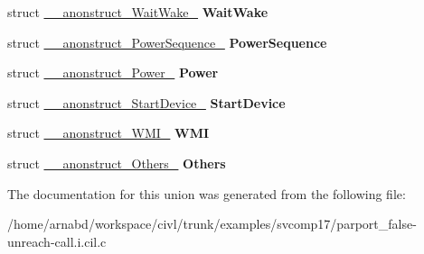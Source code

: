 \begin{DoxyCompactItemize}
\item 
\hypertarget{union____anonunion__Parameters__55_a4e9107aa2bda6510ecc89ee7858781e0}{}struct \hyperlink{struct____anonstruct__WaitWake__79}{\+\_\+\+\_\+anonstruct\+\_\+\+Wait\+Wake\+\_} {\bfseries Wait\+Wake}\label{union____anonunion__Parameters__55_a4e9107aa2bda6510ecc89ee7858781e0}

\item 
\hypertarget{union____anonunion__Parameters__55_a1c4b92eb517b330ecba0111a20d0e101}{}struct \hyperlink{struct____anonstruct__PowerSequence__80}{\+\_\+\+\_\+anonstruct\+\_\+\+Power\+Sequence\+\_} {\bfseries Power\+Sequence}\label{union____anonunion__Parameters__55_a1c4b92eb517b330ecba0111a20d0e101}

\item 
\hypertarget{union____anonunion__Parameters__55_a8e74a551c24131e5e0eff378359c43d9}{}struct \hyperlink{struct____anonstruct__Power__81}{\+\_\+\+\_\+anonstruct\+\_\+\+Power\+\_} {\bfseries Power}\label{union____anonunion__Parameters__55_a8e74a551c24131e5e0eff378359c43d9}

\item 
\hypertarget{union____anonunion__Parameters__55_aee15008623e20abc0f3e10952f219dff}{}struct \hyperlink{struct____anonstruct__StartDevice__82}{\+\_\+\+\_\+anonstruct\+\_\+\+Start\+Device\+\_} {\bfseries Start\+Device}\label{union____anonunion__Parameters__55_aee15008623e20abc0f3e10952f219dff}

\item 
\hypertarget{union____anonunion__Parameters__55_a37268f03899158f13ac0be91de2489f4}{}struct \hyperlink{struct____anonstruct__WMI__83}{\+\_\+\+\_\+anonstruct\+\_\+\+W\+M\+I\+\_} {\bfseries W\+M\+I}\label{union____anonunion__Parameters__55_a37268f03899158f13ac0be91de2489f4}

\item 
\hypertarget{union____anonunion__Parameters__55_a3cd912ec0a73e5e26bdd7c6da16c8def}{}struct \hyperlink{struct____anonstruct__Others__84}{\+\_\+\+\_\+anonstruct\+\_\+\+Others\+\_} {\bfseries Others}\label{union____anonunion__Parameters__55_a3cd912ec0a73e5e26bdd7c6da16c8def}

\end{DoxyCompactItemize}


The documentation for this union was generated from the following file\+:\begin{DoxyCompactItemize}
\item 
/home/arnabd/workspace/civl/trunk/examples/svcomp17/parport\+\_\+false-\/unreach-\/call.\+i.\+cil.\+c\end{DoxyCompactItemize}
